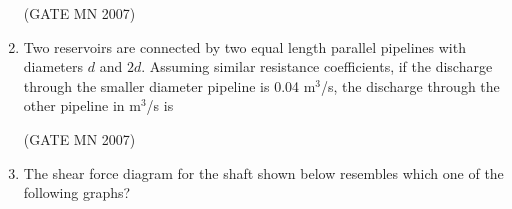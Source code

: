 \documentclass[journal]{IEEEtran}
\begin{document}
\begin{enumerate}
	\hfill (GATE MN 2007)
\begin{enumerate}
\end{enumerate}


\item Two reservoirs are connected by two equal length parallel pipelines with diameters $d$ and $2d$. Assuming similar resistance coefficients, if the discharge through the smaller diameter pipeline is 0.04 m$^3$/s, the discharge through the other pipeline in m$^3$/s is 


	\hfill (GATE MN 2007)
\begin{enumerate}
\end{enumerate}


\item The shear force diagram for the shaft shown below resembles which one of the following graphs?  


\end{enumerate}
\end{document}
